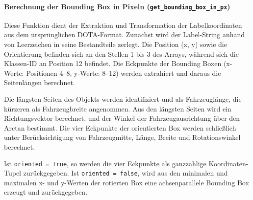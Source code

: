 \paragraph{Berechnung der Bounding Box in Pixeln (\texttt{get\_bounding\_box\_in\_px})}

Diese Funktion dient der Extraktion und Transformation der Labelkoordinaten aus dem ursprünglichen \acrshort{DOTA}-Format. Zunächst wird der Label-String anhand von Leerzeichen in seine Bestandteile zerlegt. Die Position (x, y) sowie die Orientierung befinden sich an den Stellen 1 bis 3 des Arrays, während sich die Klassen-\acrshort{ID} an Position 12 befindet. Die Eckpunkte der Bounding Boxen (x-Werte: Positionen 4–8, y-Werte: 8–12) werden extrahiert und daraus die Seitenlängen berechnet.

Die längsten Seiten des Objekts werden identifiziert und als Fahrzeuglänge, die kürzeren als Fahrzeugbreite angenommen. Aus den längsten Seiten wird ein Richtungsvektor berechnet, und der Winkel der Fahrzeugausrichtung über den Arctan bestimmt. Die vier Eckpunkte der orientierten Box werden schließlich unter Berücksichtigung von Fahrzeugmitte, Länge, Breite und Rotationswinkel berechnet.

Ist \texttt{oriented = true}, so werden die vier Eckpunkte als ganzzahlige Koordinaten-Tupel zurückgegeben. Ist \texttt{oriented = false}, wird aus den minimalen und maximalen x- und y-Werten der rotierten Box eine achsenparallele Bounding Box erzeugt und zurückgegeben.

